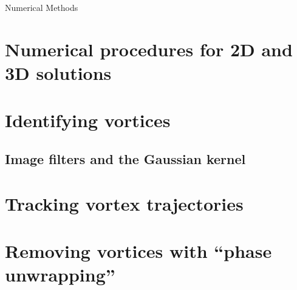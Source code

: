\begin{chapter}{\label{cha:numerics}Numerical Methods}
\section{\label{section:RK} Numerical procedures for 2D and 3D solutions}
\section{\label{section:vortexidentifying} Identifying vortices}
	\subsection{\label{section:gaussianblur} Image filters and the Gaussian kernel}
\section{\label{section:vortextracking} Tracking vortex trajectories}
\section{\label{section:vortexremoval} Removing vortices with ``phase unwrapping''}
\end{chapter}